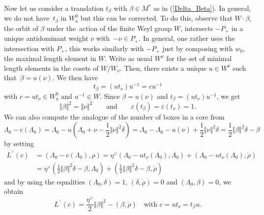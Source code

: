 \documentclass[pdftex]{sigma}
\numberwithin{equation}{section}
\begin{document}
Now let us consider a translation $t_{\beta}$ with $\beta\in M^{\ast}$ as in
(\ref{Delta_Beta}). In general, we do not have~$t_{\beta}$ in $W_{a}^{0}$ but
this can be corrected. To do this, observe that $W\cdot\beta$, the orbit of
$\beta$ under the~action of the finite Weyl group $W$, intersects $-P_{+}$ in
a unique antidominant weight $\nu$ with~${-\nu\in P_{+}}$. In general, one
rather uses the intersection with $P_{+}$, this works similarly with $-P_{+}$
just by composing with $w_{0}$, the maximal length element in $W$. Write as
usual $W^{\nu}$ for the set of minimal length elements in the cosets of
$W/W_{\nu}$. Then, there exists a unique $u\in W^{\nu}$ such that~${\beta=u(\nu)}$. We then have
\[
t_{\beta}=(ut_{\nu})u^{-1}=cu^{-1}%
\]
with $c=ut_{\nu}\in W_{a}^{0}$ and $u^{-1}\in W$. Since $\beta=u(\nu)$ and
$t_{\beta}=(ut_{\nu})u^{-1}$, we get
\[
 \Vert \beta \Vert ^{2}= \Vert \nu \Vert ^{2}\qquad\text{and}\qquad \varepsilon(t_{\beta})=\varepsilon(t_{\nu})=1.
\]
We can also compute the analogue of the number of boxes in a core from%
\[
\Lambda_{0}-c(\Lambda_{0})=\Lambda_{0}-u\left( \Lambda_{0}+\nu-\frac{1}%
{2} \Vert \nu \Vert ^{2}\delta\right) =\Lambda_{0}-\Lambda_{0}%
-u(\nu)+\frac{1}{2} \Vert \nu \Vert ^{2}\delta=\frac{1}{2} \Vert
\beta \Vert ^{2}\delta-\beta
\]
by setting
\begin{align*}
L^{^{\vee}}(c)&=(\Lambda_{0}-c(\Lambda_{0}),\rho) =\eta^{\vee}(
\Lambda_{0}-ut_{\nu}(\Lambda_{0}),\Lambda_{0}) +( \Lambda
_{0}-ut_{\nu}(\Lambda_{0}),\mathring{\rho}) \\
& =\eta^{\vee}\left( \frac{1}{2} \Vert \beta \Vert ^{2}\delta
-\beta,\Lambda_{0}\right) +\left( \frac{1}{2} \Vert \beta \Vert
^{2}\delta-\beta,\mathring{\rho}\right)
\end{align*}
and by using the equalities $(\Lambda_{0},\delta)=1$, $(\delta,\mathring{\rho
})=0$ and $(\Lambda_{0},\beta)=0$, we obtain
\[
L^{^{\vee}}(c)=\frac{\eta^{\vee}}{2} \Vert \beta \Vert ^{2}%
-(\beta,\mathring{\rho})\quad \text{with }c=ut_{\nu}=t_{\beta}u.
\]
\end{document}
